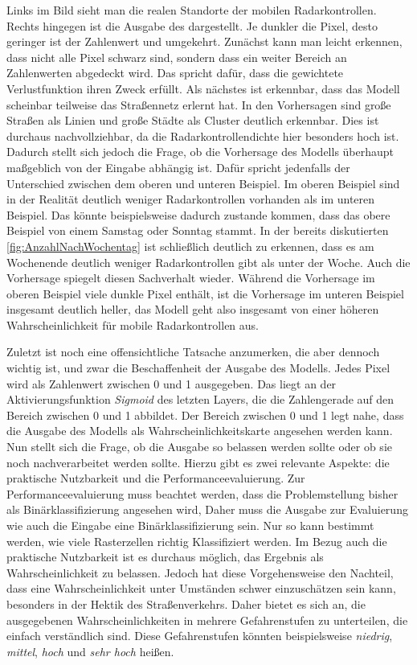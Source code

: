 Links im Bild sieht man die realen Standorte der mobilen Radarkontrollen.
Rechts hingegen ist die Ausgabe des  dargestellt.
Je dunkler die Pixel, desto geringer ist der Zahlenwert und umgekehrt.
Zunächst kann man leicht erkennen, dass nicht alle Pixel schwarz sind, sondern dass ein weiter Bereich an Zahlenwerten abgedeckt wird.
Das spricht dafür, dass die gewichtete Verlustfunktion ihren Zweck erfüllt.
Als nächstes ist erkennbar, dass das Modell scheinbar teilweise das Straßennetz erlernt hat.
In den Vorhersagen sind große Straßen als Linien und große Städte als Cluster deutlich erkennbar.
Dies ist durchaus nachvollziehbar, da die Radarkontrollendichte hier besonders hoch ist.
Dadurch stellt sich jedoch die Frage, ob die Vorhersage des Modells überhaupt maßgeblich von der Eingabe abhängig ist.
Dafür spricht jedenfalls der Unterschied zwischen dem oberen und unteren Beispiel.
Im oberen Beispiel sind in der Realität deutlich weniger Radarkontrollen vorhanden als im unteren Beispiel.
Das könnte beispielsweise dadurch zustande kommen, dass das obere Beispiel von einem Samstag oder Sonntag stammt.
In der bereits diskutierten \autoref{fig:AnzahlNachWochentag} ist schließlich deutlich zu erkennen, dass es am Wochenende deutlich weniger Radarkontrollen gibt als unter der Woche.
Auch die Vorhersage spiegelt diesen Sachverhalt wieder.
Während die Vorhersage im oberen Beispiel viele dunkle Pixel enthält, ist die Vorhersage im unteren Beispiel insgesamt deutlich heller, das Modell geht also insgesamt von einer höheren Wahrscheinlichkeit für mobile Radarkontrollen aus.

Zuletzt ist noch eine offensichtliche Tatsache anzumerken, die aber dennoch wichtig ist, und zwar die Beschaffenheit der Ausgabe des Modells.
Jedes Pixel wird als Zahlenwert zwischen 0 und 1 ausgegeben.
Das liegt an der Aktivierungsfunktion \emph{Sigmoid} des letzten Layers, die die Zahlengerade auf den Bereich zwischen 0 und 1 abbildet.
Der Bereich zwischen 0 und 1 legt nahe, dass die Ausgabe des Modells als Wahrscheinlichkeitskarte angesehen werden kann.
Nun stellt sich die Frage, ob die Ausgabe so belassen werden sollte oder ob sie noch nachverarbeitet werden sollte.
Hierzu gibt es zwei relevante Aspekte: die praktische Nutzbarkeit und die Performanceevaluierung.
Zur Performanceevaluierung muss beachtet werden, dass die Problemstellung bisher als Binärklassifizierung angesehen wird,
Daher muss die Ausgabe zur Evaluierung wie auch die Eingabe eine Binärklassifizierung sein.
Nur so kann bestimmt werden, wie viele Rasterzellen richtig Klassifiziert werden.
Im Bezug auch die praktische Nutzbarkeit ist es durchaus möglich, das Ergebnis als Wahrscheinlichkeit zu belassen.
Jedoch hat diese Vorgehensweise den Nachteil, dass eine Wahrscheinlichkeit unter Umständen schwer einzuschätzen sein kann, besonders in der Hektik des Straßenverkehrs.
Daher bietet es sich an, die ausgegebenen Wahrscheinlichkeiten in mehrere Gefahrenstufen zu unterteilen, die einfach verständlich sind.
Diese Gefahrenstufen könnten beispielsweise \emph{niedrig}, \emph{mittel}, \emph{hoch} und \emph{sehr hoch} heißen.

